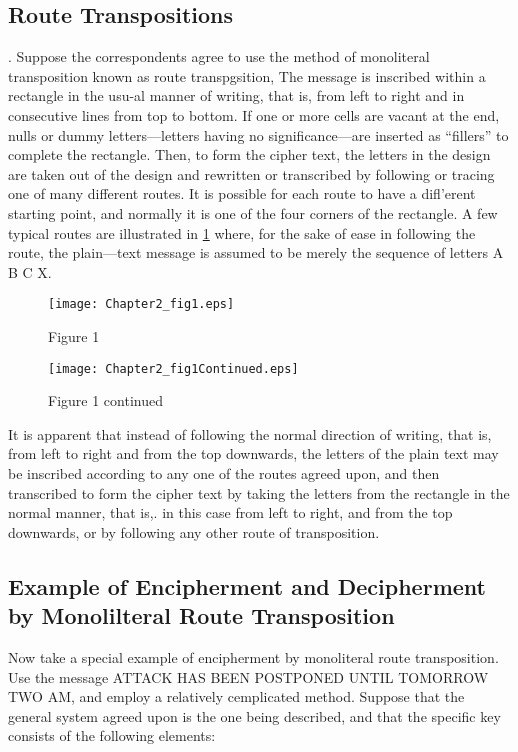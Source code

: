 \subsection{Route Transpositions}

\mypara. Suppose the correspondents agree to use the method of monoliteral
transposition known as route transpgsition, The message is inscribed 
within a rectangle in the usu-al manner of writing, that is, from left to
right and in consecutive lines from top to bottom. If one or more cells
are vacant at the end, nulls or dummy letters—letters having no significance—are inserted as “fillers” to complete the rectangle. Then, to form
the cipher text, the letters in the design are taken out of the design and
rewritten or transcribed by following or tracing one of many different
routes. It is possible for each route to have a diﬂ’erent starting point, and
normally it is one of the four corners of the rectangle. A few typical
routes are illustrated in \ref{fig:Figure 1} where, for the sake of ease in following
the route, the plain—text message is assumed to be merely the sequence
of letters A B C X.

\begin{figure}[h]
  \centering
    \texttt{[image: Chapter2\_fig1.eps]}
    \caption{Figure 1}
    \label{fig:Figure 1}
\end{figure}

\begin{figure}[h]
  \centering
    \texttt{[image: Chapter2\_fig1Continued.eps]}
    \caption{Figure 1 continued}
\end{figure}


\mypara It is apparent that instead of following the normal direction of
writing, that is, from left to right and from the top downwards, the
letters of the plain text may be inscribed according to any one of the
routes agreed upon, and then transcribed to form the cipher text by
taking the letters from the rectangle in the normal manner, that is,. in
this case from left to right, and from the top downwards, or by following any other route of transposition.

\subsection{Example of Encipherment and Decipherment by Monolilteral Route Transposition}

\mypara Now take a special example of encipherment by monoliteral route
transposition. Use the message ATTACK HAS BEEN POSTPONED
UNTIL TOMORROW TWO AM, and employ a relatively cemplicated
method. Suppose that the general system agreed upon is the one being
described, and that the specific key consists of the following elements:

